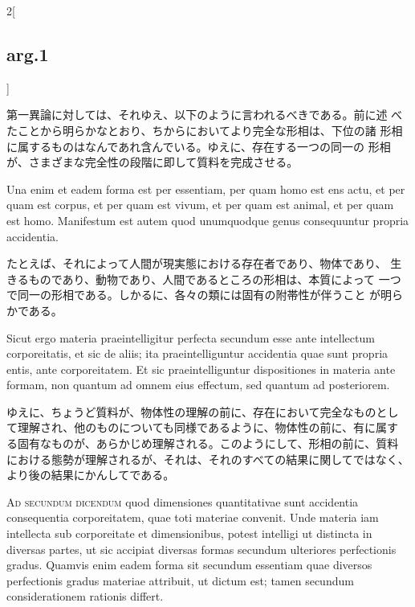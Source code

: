 \documentclass[paper=a4paper,fontsize=10pt,jafontsize=9pt,titlepage]{jlreq}
\begin{document}
\begin{paracol}{2}[\subsection{arg.1}]
\switchcolumn

 第一異論に対しては、それゆえ、以下のように言われるべきである。前に述
 べたことから明らかなとおり、ちからにおいてより完全な形相は、下位の諸
 形相に属するものはなんであれ含んでいる。ゆえに、存在する一つの同一の
 形相が、さまざまな完全性の段階に即して質料を完成させる。
 
\switchcolumn*

 Una enim et eadem forma est per essentiam, per
quam homo est ens actu, et per quam est corpus, et per quam est vivum,
et per quam est animal, et per quam est homo. Manifestum est autem
 quod unumquodque genus consequuntur propria accidentia.

 
\switchcolumn

 たとえば、それによって人間が現実態における存在者であり、物体であり、
 生きるものであり、動物であり、人間であるところの形相は、本質によって
 一つで同一の形相である。しかるに、各々の類には固有の附帯性が伴うこと
 が明らかである。
 
\switchcolumn*

 Sicut ergo materia praeintelligitur perfecta secundum esse ante
intellectum corporeitatis, et sic de aliis; ita praeintelliguntur
accidentia quae sunt propria entis, ante corporeitatem. Et sic
praeintelliguntur dispositiones in materia ante formam, non quantum ad
omnem eius effectum, sed quantum ad posteriorem.

\switchcolumn

ゆえに、ちょうど質料が、物体性の理解の前に、存在において完全なものとし
て理解され、他のものについても同様であるように、物体性の前に、有に属す
る固有なものが、あらかじめ理解される。このようにして、形相の前に、質料
における態勢が理解されるが、それは、それのすべての結果に関してではなく、
より後の結果にかんしてである。
 
\switchcolumn*[\subsection{ad 2}]

{\scshape Ad secundum dicendum} quod dimensiones quantitativae sunt
accidentia consequentia corporeitatem, quae toti materiae
convenit. Unde materia iam intellecta sub corporeitate et
dimensionibus, potest intelligi ut distincta in diversas partes, ut
sic accipiat diversas formas secundum ulteriores perfectionis
gradus. Quamvis enim eadem forma sit secundum essentiam quae diversos
perfectionis gradus materiae attribuit, ut dictum est; tamen secundum
considerationem rationis differt.


\end{paracol}
\end{document}
